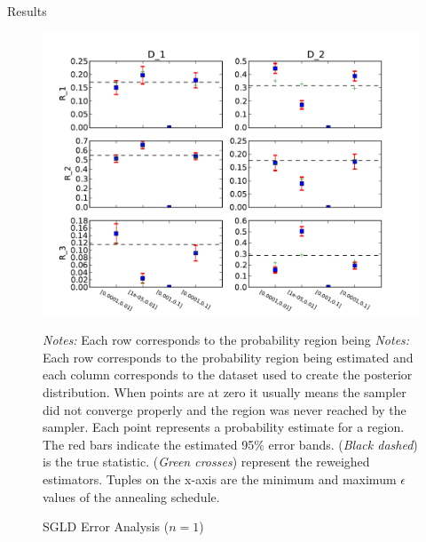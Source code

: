 \documentclass{article}
\begin{document}
\begin{section}{Results}
\begin{figure}[h!]
\caption{SGLD Error Analysis ($n=1$)}
\label{n1}
\begin{center}
\includegraphics[scale=0.7]{../figures/errors_n1.pdf}
\end{center}
{\scriptsize {\em Notes:} Each row corresponds to the probability region being {\em Notes:} Each row corresponds to the probability region being estimated and each column corresponds to the dataset used to create the posterior distribution. When points are at zero it usually means the sampler did not converge properly and the region was never reached by the sampler.  Each point represents a probability estimate for a region. The red bars indicate the estimated 95\% error bands.  ({\em Black dashed}) is the true statistic.  ({\em Green crosses}) represent the reweighed estimators. Tuples on the x-axis are the minimum and maximum $\epsilon$ values of the annealing schedule. }
\end{figure}
\newpage
\end{section}
\end{document}

